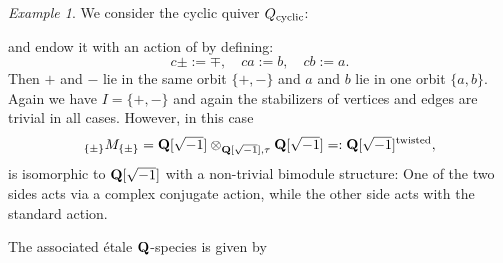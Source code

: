 \documentclass[a4paper,12pt,reqno]{amsart}
\newcommand{\QQ}{{\rm\bf Q}}
\theoremstyle{plain}
\theoremstyle{remark}
\newtheorem{example}[theorem]{Example}
\begin{document}
    \begin{example}\label{ex:cyclic}
    We consider the cyclic quiver $Q_{\rm cyclic}$:
    \begin{center}
    \end{center}
    and endow it with an action of by defining:
    \[
    c\pm :=\mp,\quad c a:=b,\quad cb:=a.
    \]
    Then $+$ and $-$ lie in the same orbit $\{+,-\}$ and $a$ and $b$ lie in one orbit $\{a,b\}$. Again we have $I=\{+,-\}$ and again the stabilizers of vertices and edges are trivial in all cases. However, in this case
    \[
    {}_{\{\pm\}}M_{\{\pm\}}=\QQ[\sqrt{-1}]\otimes_{\QQ[\sqrt{-1}],\tau}\QQ[\sqrt{-1}]=:\QQ[\sqrt{-1}]^{\rm twisted},
    \]
    is isomorphic to $\QQ[\sqrt{-1}]$ with a non-trivial bimodule structure: One of the two sides acts via a complex conjugate action, while the other side acts with the standard action.

    The associated \'etale $\QQ$-species is given by
    \begin{center}
            \hspace*{2em}
    \end{center}
  \end{example}
\end{document}
